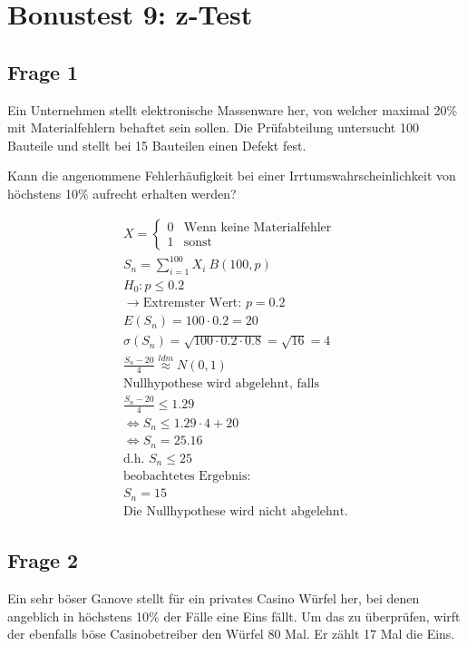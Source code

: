 \chapter{Bonustest 9: z-Test}

\section{Frage 1}
Ein Unternehmen stellt elektronische Massenware her, von welcher maximal 20\% mit Materialfehlern behaftet sein sollen. Die Prüfabteilung untersucht 100 Bauteile und stellt bei 15 Bauteilen einen Defekt fest. 

Kann die angenommene Fehlerhäufigkeit bei einer Irrtumswahrscheinlichkeit von höchstens 10\% aufrecht erhalten werden?

\begin{align*}
    X = \begin{cases}
        0 & \text{Wenn keine Materialfehler} \\
        1 & \text{sonst}
    \end{cases} \\
    S_n = \sum_{i = 1}^{100} X_i ~ B(100, p) \\
    H_0: p \leq 0.2 \\
    \rightarrow \text{Extremster Wert: } p = 0.2 \\
    E(S_n) = 100 \cdot 0.2 = 20 \\
    \sigma(S_n) = \sqrt{100  \cdot 0.2 \cdot 0.8} = \sqrt{16} = 4 \\
    \frac{S_n - 20}{4} \overset{ldm}{\approx} N(0, 1) \\
    \text{Nullhypothese wird abgelehnt, falls} \\
    \frac{S_n - 20}{4} \leq 1.29 \\
    \Leftrightarrow S_n \leq 1.29 \cdot 4 + 20 \\
    \Leftrightarrow S_n = 25.16 \\
    \text{d.h. } S_n \leq 25 \\
    \text{beobachtetes Ergebnis:} \\
    S_n = 15 \\
    \text{Die Nullhypothese wird nicht abgelehnt.}
\end{align*}

\section{Frage 2}
Ein sehr böser Ganove stellt für ein privates Casino Würfel her, bei denen angeblich in höchstens 10\% der Fälle eine Eins fällt. Um das zu überprüfen, wirft der ebenfalls böse Casinobetreiber den Würfel 80 Mal. Er zählt 17 Mal die Eins.

